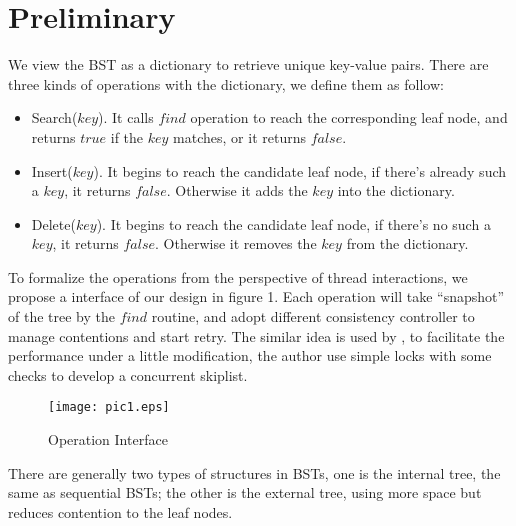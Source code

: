 \documentclass{article}
\begin{document}
\section{Preliminary}
We view the BST as a dictionary to retrieve unique key-value pairs. There are three kinds of operations with the dictionary, we define them as follow:
\begin{itemize}
\item Search($key$). It calls $find$ operation to reach the corresponding leaf node, and returns $true$ if the $key$ matches, or it returns $false$.
\item Insert($key$). It begins to reach the candidate leaf node, if there's already such a $key$, it returns $false$. Otherwise it adds the $key$ into the dictionary.
\item Delete($key$). It begins to reach the candidate leaf node, if there's no such a $key$, it returns $false$. Otherwise it removes the $key$ from the dictionary.
\end{itemize}
To formalize the operations from the perspective of thread interactions, we propose a interface of our design in figure 1. Each operation will take ``snapshot'' of the tree by the $find$ routine, and adopt different consistency controller to manage contentions and start retry. The similar idea is used by \cite{herlihy2007simple}, to facilitate the performance under a little modification, the author use simple locks with some checks to develop a concurrent skiplist.\\
\begin{figure}[htbp]
\centering
\texttt{[image: pic1.eps]}
\caption{Operation Interface}
\label{fig:my_label1}
\end{figure}
There are generally two types of structures in BSTs, one is the internal tree, the same as sequential BSTs; the other is the external tree, using more space but reduces contention to the leaf nodes. 
\end{document}
